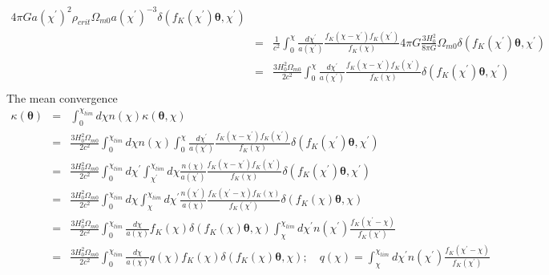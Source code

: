 \documentclass[twocolumn]{aastex62}
\begin{document}
\begin{eqnarray}
4\pi G a(\chi^{\prime})^2 \rho_{crit}\Omega_{m0}a(\chi^{\prime})^{-3} \delta(f_K(\chi^{\prime})\boldsymbol{\theta},\chi^{\prime})\\ \nonumber
&=& \frac{1}{c^2}\int_0^{\chi} \frac{d\chi^{\prime}}{a(\chi^{\prime})} \frac{f_K(\chi - \chi^{\prime})f_K(\chi^{\prime})}{f_K(\chi)}
4\pi G \frac{3H_0^2}{8\pi G}\Omega_{m0} \delta(f_K(\chi^{\prime})\boldsymbol{\theta},\chi^{\prime})\\ \nonumber
&=& \frac{3H_0^2\Omega_{m0}}{2c^2}\int_0^{\chi} \frac{d\chi^{\prime}}{a(\chi^{\prime})} \frac{f_K(\chi - \chi^{\prime})f_K(\chi^{\prime})}{f_K(\chi)}\delta(f_K(\chi^{\prime})\boldsymbol{\theta},\chi^{\prime})\\ \nonumber
\end{eqnarray}
The mean convergence
\begin{eqnarray}
\kappa(\boldsymbol{\theta})&=&\int_0^{\chi_{lim}} d\chi n(\chi)\kappa(\boldsymbol{\theta},\chi) \\ \nonumber
&=& \frac{3H_0^2\Omega_{m0}}{2c^2}\int_0^{\chi_{lim}} d\chi n(\chi)\int_0^{\chi} \frac{d\chi^{\prime}}{a(\chi^{\prime})} \frac{f_K(\chi - \chi^{\prime})f_K(\chi^{\prime})}{f_K(\chi)}\delta(f_K(\chi^{\prime})\boldsymbol{\theta},\chi^{\prime})\\ \nonumber
&=& \frac{3H_0^2\Omega_{m0}}{2c^2}\int_0^{\chi_{lim}} d\chi^{\prime} \int_{\chi^{\prime}}^{\chi_{lim}} d\chi\frac{n(\chi)}{a(\chi^{\prime})} \frac{f_K(\chi - \chi^{\prime})f_K(\chi^{\prime})}{f_K(\chi)}\delta(f_K(\chi^{\prime})\boldsymbol{\theta},\chi^{\prime})\\ \nonumber
&=& \frac{3H_0^2\Omega_{m0}}{2c^2}\int_0^{\chi_{lim}} d\chi \int_{\chi}^{\chi_{lim}} d\chi^{\prime}\frac{n(\chi^{\prime})}{a(\chi)} \frac{f_K(\chi^{\prime} - \chi)f_K(\chi)}{f_K(\chi^{\prime})}\delta(f_K(\chi)\boldsymbol{\theta},\chi)\\ \nonumber
&=& \frac{3H_0^2\Omega_{m0}}{2c^2}\int_0^{\chi_{lim}} \frac{d\chi}{a(\chi)} f_K(\chi)\delta(f_K(\chi)\boldsymbol{\theta},\chi)\int_{\chi}^{\chi_{lim}} d\chi^{\prime}n(\chi^{\prime}) \frac{f_K(\chi^{\prime} - \chi)}{f_K(\chi^{\prime})}\\ \nonumber
&=& \frac{3H_0^2\Omega_{m0}}{2c^2}\int_0^{\chi_{lim}}  \frac{d\chi}{a(\chi)}q(\chi)f_K(\chi)\delta(f_K(\chi)\boldsymbol{\theta},\chi)
;\quad q(\chi)=\int_{\chi}^{\chi_{lim}} d\chi^{\prime}n(\chi^{\prime}) \frac{f_K(\chi^{\prime} - \chi)}{f_K(\chi^{\prime})}\\ \nonumber
\end{eqnarray}
\end{document}
